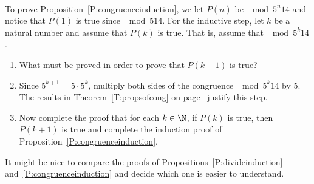 \begin{prog} \hfill \\
To prove Proposition~\ref{P:congruenceinduction}, we let $P(n)$ be $\mod{ 5^n }{1}{4}$ and notice that $P(1)$ is true since $\mod{5}{1}{4}$.  For the inductive step, let $k$ be a natural number and assume that $P(k)$ is true.  That is, assume that $\mod{ 5^k }{1}{4}$.
\begin{enumerate}
  \item What must be proved in order to prove that $P(k+1)$ is true?
  \item Since $5^{k+1} = 5 \cdot 5^k$, multiply both sides of the congruence $\mod{ 5^k }{1}{4}$ by 5.  The results in Theorem~\ref{T:propsofcong} on page~\pageref{T:propsofcong} justify this step.
  \item Now complete the proof that for each $k \in \N$, if $P(k)$ is true, then $P(k+1)$ is true and complete the induction proof of Proposition~\ref{P:congruenceinduction}.
\end{enumerate}
It might be nice to compare the proofs of Propositions~\ref{P:divideinduction} and~\ref{P:congruenceinduction} and decide which one is easier to understand.
\end{prog}


\hbreak

\endinput
